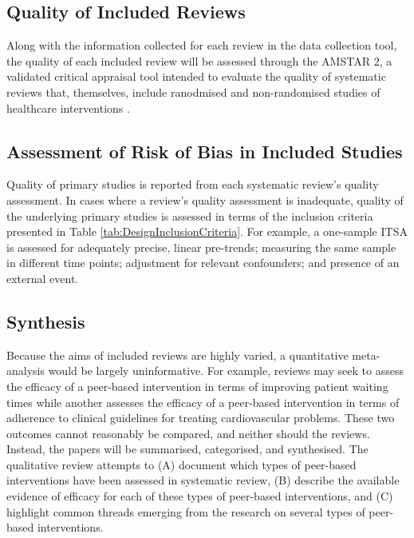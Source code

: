 \documentclass[12pt]{article}
\begin{document}
\subsection{Quality of Included Reviews}

Along with the information collected for each review in the data collection tool, the quality of each included review will be assessed through the AMSTAR 2, a validated critical appraisal tool intended to evaluate the quality of systematic reviews that, themselves, include ranodmised and non-randomised studies of healthcare interventions \citep{sheaAMSTARCriticalAppraisal2017}.

\subsection{Assessment of Risk of Bias in Included Studies}

Quality of primary studies is reported from each systematic review's quality assessment. In cases where a review's quality assessment is inadequate, quality of the underlying primary studies is assessed in terms of the inclusion criteria presented in Table \ref{tab:DesignInclusionCriteria}. For example, a one-sample ITSA is assessed for adequately precise, linear pre-trends; measuring the same sample in different time points; adjustment for relevant confounders; and presence of an external event.

\subsection{Synthesis}

Because the aims of included reviews are highly varied, a quantitative meta-analysis would be largely uninformative. For example, reviews may seek to assess the efficacy of a peer-based intervention in terms of improving patient waiting times while another assesses the efficacy of a peer-based intervention in terms of adherence to clinical guidelines for treating cardiovascular problems. These two outcomes cannot reasonably be compared, and neither should the reviews. Instead, the papers will be summarised, categorised, and synthesised. The qualitative review attempts to (A) document which types of peer-based interventions have been assessed in systematic review, (B) describe the available evidence of efficacy for each of these types of peer-based interventions, and (C) highlight common threads emerging from the research on several types of peer-based interventions.
\end{document}

